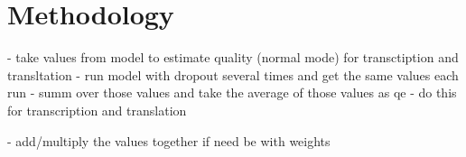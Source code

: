 
\chapter{Methodology}

- take values from model to estimate quality (normal mode) for transctiption and transltation 
- run model with dropout several times and get the same values each run 
- summ over those values and take the average of those values as qe 
- do this for transcription and translation 

- add/multiply the values together if need be with weights 
